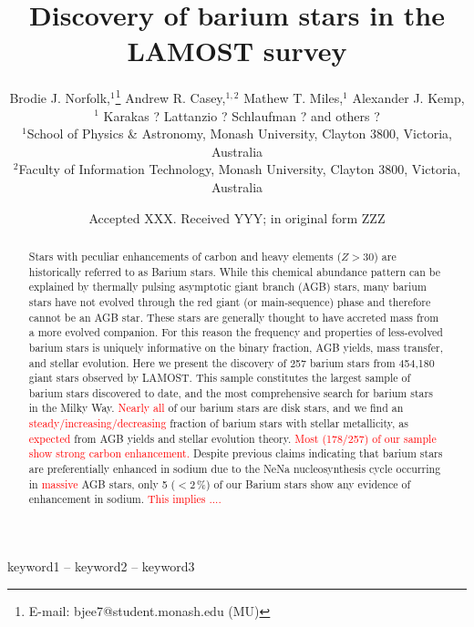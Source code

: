 \documentclass[a4paper,fleqn,usenatbib]{mnras}
\title[Barium stars in LAMOST]{Discovery of barium stars in the LAMOST survey}
\author[B. J. Norfolk et al.]{Brodie J. Norfolk,$^{1}$\thanks{E-mail: bjee7@student.monash.edu (MU)}
Andrew R. Casey,$^{1,2}$
Mathew T. Miles,$^{1}$
Alexander J. Kemp,$^{1}$ \newauthor
Karakas ? Lattanzio ? Schlaufman ? and others ?
\\
$^{1}$School of Physics \& Astronomy, Monash University, Clayton 3800, Victoria, Australia\\
$^{2}$Faculty of Information Technology, Monash University, Clayton 3800, Victoria, Australia\\
}
\date{Accepted XXX. Received YYY; in original form ZZZ}
\newcommand{\todo}[1]{\textcolor{red}{#1}}
\begin{document}
\label{firstpage}
\pagerange{\pageref{firstpage}--\pageref{lastpage}}
\maketitle

\begin{abstract}
Stars with peculiar enhancements of carbon and heavy elements ($Z > 30$) are historically referred to as Barium stars. While this chemical abundance pattern can be explained by thermally pulsing asymptotic giant branch (AGB) stars, many barium stars have not evolved through the red giant (or main-sequence) phase and therefore cannot be an AGB star. These stars are generally thought to have accreted mass from a more evolved companion. For this reason the frequency and properties of less-evolved barium stars is uniquely informative on the binary fraction, AGB yields, mass transfer, and stellar evolution. Here we present the discovery of 257 barium stars from 454,180 giant stars observed by LAMOST. This sample constitutes the largest sample of barium stars discovered to date, and the most comprehensive search for barium stars in the Milky Way. \todo{Nearly all} of our barium stars are disk stars, and we find an \todo{steady/increasing/decreasing} fraction of barium stars with stellar metallicity, as \todo{expected} from AGB yields and stellar evolution theory.  
\todo{Most (178/257) of our sample show strong carbon enhancement.}
Despite previous claims indicating that barium stars are preferentially enhanced in sodium due to the NeNa nucleosynthesis cycle occurring in \todo{massive} AGB stars, only 5 ($<2$\,\%) of our Barium stars show any evidence of enhancement in sodium. \todo{This implies ....}
\end{abstract}

\begin{keywords}
keyword1 -- keyword2 -- keyword3
\end{keywords}
\end{document}
